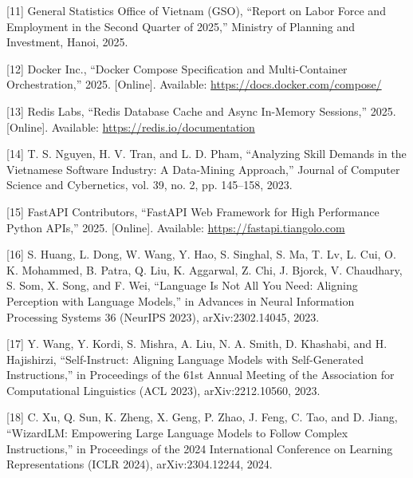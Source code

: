 \documentclass[12pt, a4paper]{report}
\renewcommand{\textit}[1]{\textup{#1}}
\begin{document}
{\hypertarget{cite11}{}[11] General Statistics Office of Vietnam (GSO), ``Report on Labor Force and Employment in the Second Quarter of 2025,'' Ministry of Planning and Investment, Hanoi, 2025.

\hypertarget{cite12}{}[12] Docker Inc., ``Docker Compose Specification and Multi-Container Orchestration,'' 2025. [Online]. Available: \url{https://docs.docker.com/compose/}

\hypertarget{cite13}{}[13] Redis Labs, ``Redis Database Cache and Async In-Memory Sessions,'' 2025. [Online]. Available: \url{https://redis.io/documentation}

\hypertarget{cite14}{}[14] T. S. Nguyen, H. V. Tran, and L. D. Pham, ``Analyzing Skill Demands in the Vietnamese Software Industry: A Data-Mining Approach,'' \textit{Journal of Computer Science and Cybernetics}, vol. 39, no. 2, pp. 145--158, 2023.

\hypertarget{cite15}{}[15] FastAPI Contributors, ``FastAPI Web Framework for High Performance Python APIs,'' 2025. [Online]. Available: \url{https://fastapi.tiangolo.com}

\hypertarget{cite16}{}[16] S. Huang, L. Dong, W. Wang, Y. Hao, S. Singhal, S. Ma, T. Lv, L. Cui, O. K. Mohammed, B. Patra, Q. Liu, K. Aggarwal, Z. Chi, J. Bjorck, V. Chaudhary, S. Som, X. Song, and F. Wei, ``Language Is Not All You Need: Aligning Perception with Language Models,'' in \textit{Advances in Neural Information Processing Systems 36 (NeurIPS 2023)}, \textit{arXiv:2302.14045}, 2023.

\hypertarget{cite17}{}[17] Y. Wang, Y. Kordi, S. Mishra, A. Liu, N. A. Smith, D. Khashabi, and H. Hajishirzi, ``Self-Instruct: Aligning Language Models with Self-Generated Instructions,'' in \textit{Proceedings of the 61st Annual Meeting of the Association for Computational Linguistics (ACL 2023)}, \textit{arXiv:2212.10560}, 2023.

\hypertarget{cite18}{}[18] C. Xu, Q. Sun, K. Zheng, X. Geng, P. Zhao, J. Feng, C. Tao, and D. Jiang, ``WizardLM: Empowering Large Language Models to Follow Complex Instructions,'' in \textit{Proceedings of the 2024 International Conference on Learning Representations (ICLR 2024)}, \textit{arXiv:2304.12244}, 2024.
}

\newpage

\appendix
\renewcommand{\thefigure}{A.\arabic{figure}}

\vspace{1cm}
\end{document}

